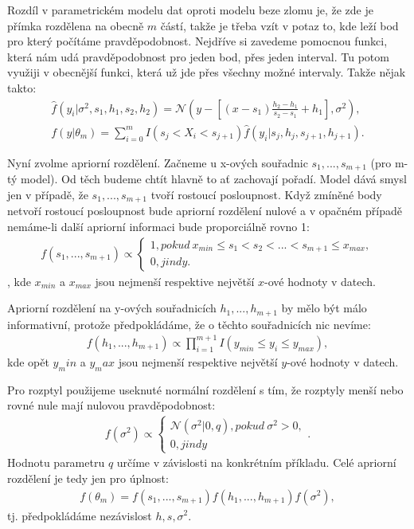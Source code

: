 \documentclass[czech,master,public,dept470,male,cpdeclaration,oneside, python]{diploma}
\begin{document}
Rozdíl v parametrickém modelu dat oproti modelu beze zlomu je, že zde je přímka rozdělena na obecně $m$ částí, takže je třeba vzít v potaz to, kde leží bod pro který počítáme pravděpodobnost. Nejdříve si zavedeme pomocnou funkci, která nám udá pravděpodobnost pro jeden bod, přes jeden interval. Tu potom využiji v obecnější funkci, která už jde přes všechny možné intervaly. Takže nějak takto:
\begin{align}\label{parameticky_model}
\hat{f}(y_i | \sigma^2, s_1, h_1, s_2, h_2) = \mathcal{N}(y - [(x - s_1)\frac{h_2 - h_1}{s_2 - s_1} + h_1], \sigma^2), \\
f(y | \theta_m) = \sum_{i=0}^{m} I(s_j < X_i < s_{j+1}) 
\hat{f}(y_i | s_j, h_j, s_{j+1}, h_{j+1}).
\end{align} \par
Nyní zvolme apriorní rozdělení. Začneme u x-ových souřadnic $s_1, ..., s_{m+1}$ (pro m-tý model). Od těch budeme chtít hlavně to ať zachovají pořadí. Model dává smysl jen v případě, že $s_1, ..., s_{m+1}$ tvoří rostoucí posloupnost. Když zmíněné body netvoří rostoucí posloupnost bude apriorní rozdělení nulové a v opačném případě nemáme-li další apriorní informaci bude proporciálně rovno 1:
\begin{align}
f(s_1, ..., s_{m+1}) \propto
	\begin{cases}
		1, pokud\ x_{min} \leq s_1 < s_2 < ... < s_{m+1} \leq x_{max}, \\
		0, jindy.		
	\end{cases}
\end{align},
kde $x_{min}$ a $x_{max}$ jsou nejmenší respektive největší $x$-ové hodnoty v datech. \par
Apriorní rozdělení na y-ových souřadnicích $h_1, ..., h_{m+1}$ by mělo být málo informativní, protože předpokládáme, že o těchto souřadnicích nic nevíme:
\begin{align}
f(h_1,..., h_{m+1}) \propto \prod_{i=1}^{m+1} I(y_{min} \leq y_i \leq y_{max}),
\end{align}
kde opět $y_min$ a $y_max$ jsou nejmenší respektive největší $y$-ové hodnoty v datech. \par
Pro rozptyl použijeme useknuté normální rozdělení s tím, že rozptyly menší nebo rovné nule mají nulovou pravděpodobnost:
\begin{align}
f(\sigma^2) \propto 
\begin{cases}
\mathcal{N}(\sigma^2 | 0, q), pokud\  \sigma^2 > 0, \\
0, jindy
\end{cases}.
\end{align}
Hodnotu parametru $q$ určíme v závislosti na konkrétním příkladu.
Celé apriorní rozdělení je tedy jen pro úplnost:
\begin{align}\label{apriorni}
f(\theta_m) = f(s_1, ..., s_{m+1})f(h_1,..., h_{m+1})f(\sigma^2),
\end{align}
tj. předpokládáme nezávislost $h,s,\sigma^2$. \par
\end{document}
